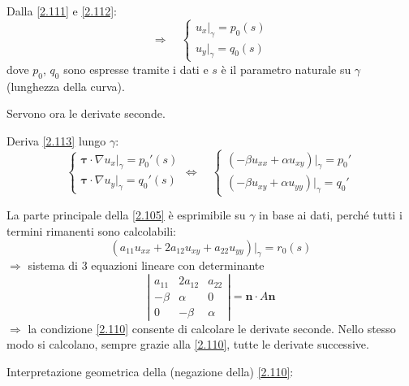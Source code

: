\documentclass[a4paper,11pt]{report}
\newcommand{\vect}[1]{\boldsymbol{#1}}
\begin{document}
Dalla \eqref{2.111} e \eqref{2.112}:
\begin{equation}
\Rightarrow \quad 
\begin{cases}
u_x \big|_{\gamma}=p_0(s)\\
u_y \big|_{\gamma}=q_0(s)
\end{cases}
\label{2.113}
\end{equation}
dove $p_0$, $q_0$ sono espresse tramite i dati e $s$ \`e il parametro naturale su $\gamma$ (lunghezza della curva).

Servono ora le derivate seconde.

Deriva \eqref{2.113} lungo $\gamma$:
\[
\begin{cases}
\vect{\tau}\cdot \nabla u_x \big|_{\gamma}= p_0'(s)\\
\vect{\tau}\cdot \nabla u_y \big|_{\gamma}=q_0'(s)
\end{cases}
\Leftrightarrow \quad
\begin{cases}
(-\beta u_{xx} + \alpha u_{xy}) \big|_{\gamma}=p_0'\\
(-\beta u_{xy} + \alpha u_{yy}) \big|_{\gamma}=q_0'
\end{cases}
\]

La parte principale della \eqref{2.105} \`e esprimibile su $\gamma$ in base ai dati, perch\'e tutti i termini rimanenti sono calcolabili:
\[
(a_{11}u_{xx}+2a_{12}u_{xy}+a_{22}u_{yy}) \big|_{\gamma}=r_0(s)
\]
$\Rightarrow$ sistema di 3 equazioni lineare con determinante
\begin{equation}
\left| \begin{matrix}
a_{11} & 2a_{12} & a_{22}\\
-\beta & \alpha & 0 \\
0 & -\beta & \alpha 
\end{matrix}\right| = \vect{n}\cdot A \vect{n}
\label{2.114}
\end{equation}
$\Rightarrow$ la condizione \eqref{2.110} consente di calcolare le derivate seconde. Nello stesso modo si calcolano, sempre grazie alla \eqref{2.110}, tutte le derivate successive.

\medskip

Interpretazione geometrica della (negazione della) \eqref{2.110}:
\end{document}
